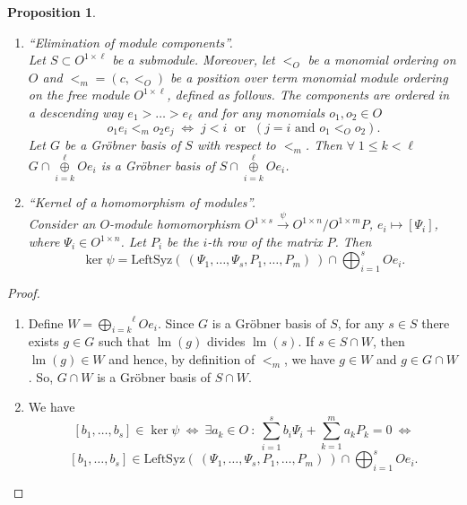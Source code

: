 \documentclass[a4paper,10pt]{article}
\newtheorem{Proposition}[Th]{Proposition}
\theoremstyle{nonumberplain}
\newtheorem{proof}{Proof}
\DeclareMathOperator{\lm}{lm}
\begin{document}
\begin{Proposition}\label{EliOfCom}
\label{propBasics}
\begin{enumerate}
\item \textit{``Elimination of module components''}. \\

Let $S\subset O^{1\times \ell}$ be a submodule. Moreover, let $<_O$ be a monomial ordering on $O$ and $<_m=(c,<_O)$ be a \textit{position over term} monomial module ordering on the free module $O^{1\times \ell}$, defined as follows.  The components are ordered in a descending way $e_1 > \dots > e_{\ell}$ and for any monomials $o_1, o_2 \in O$
\[
o_1 e_i <_m  o_2 e_j \; \Leftrightarrow \; j < i \; \text{ or } \; (j = i 
\text{ and } o_1 <_O o_2).
\]
Let $G$ be a Gr\"obner basis of $S$ with respect to $<_m$. Then $\forall \; 1\leq k < \ell \;\;$ $G \cap \overset{\ell}{\underset{i=k}{\oplus}} O e_i$ is a Gr\"obner basis of $S \cap\overset{\ell}{\underset{i=k}{\oplus}} O e_i$. 

\item \textit{``Kernel of a homomorphism of modules''}. \\

Consider an $O$-module homomorphism $O^{1 \times s} \stackrel{\psi}{\rightarrow} O^{1 \times n}/ O^{1\times m}P $, $e_i \mapsto [\Psi_i]$, where $\Psi_i \in O^{1 \times n}$. Let $P_i$ be the $i$-th row of the matrix $P$. Then
\[
\ker \psi = \mathrm{LeftSyz}( \ (\Psi_1,\ldots,\Psi_s,P_1,\ldots,P_m) \ ) \cap \bigoplus_{i=1}^s O e_i.
\]

\end{enumerate}
\end{Proposition}

\begin{proof}
\begin{enumerate}
\item Define $W= \overset{\ell}{\underset{i=k}{\bigoplus}} O e_i$. Since $G$ is a Gr\"obner basis of $S$, for any $s \in S$ there exists $g \in G$ such that $\lm(g)$ divides $\lm(s)$. If $s\in S \cap W$, then $\lm(g) \in W$ and hence, by definition of $<_m$, we have $g \in W$ and $g \in G \cap W$. So, $G \cap W$ is a Gr\"obner basis of $S\cap W$.
\item We have \[
[b_1,\ldots,b_s] \in \ker \psi \ \Leftrightarrow \ \exists a_k\in O \ : \ 
\sum_{i=1}^s b_i \Psi_i + \sum_{k=1}^m a_k P_k =0 \ \Leftrightarrow 
\]
\[
[b_1,\ldots,b_s] \in \mathrm{LeftSyz}(\ (\Psi_1,\ldots,\Psi_s,P_1,\ldots,P_m)\ ) \cap \bigoplus_{i=1}^s O e_i.
\]

\end{enumerate}
\end{proof}
\end{document}

